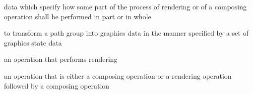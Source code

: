 %
data which specify how some part of the process of rendering or of a composing operation shall be performed in part or in whole

%
to transform a path group into graphics data in the manner specified by a set of graphics state data

%
an operation that performs rendering

%
an operation that is either a composing operation or a rendering operation followed by a composing operation

%

%
%


